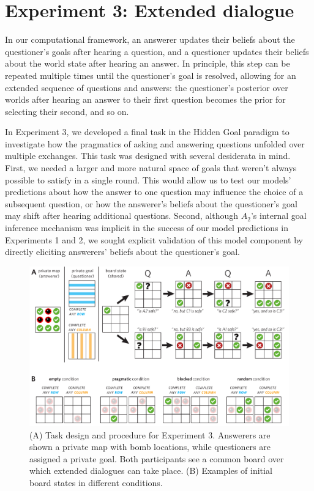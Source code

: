 \documentclass[12pt, floatsintext, jou]{apa6}
\begin{document}
\section{Experiment 3: Extended dialogue}

In our computational framework, an answerer updates their beliefs about the questioner's goals after hearing a question, and a questioner updates their beliefs about the world state after hearing an answer. 
In principle, this step can be repeated multiple times until the questioner's goal is resolved, allowing for an extended sequence of questions and answers: the questioner's posterior over worlds after hearing an answer to their first question becomes the prior for selecting their second, and so on.

In Experiment 3, we developed a final task in the Hidden Goal paradigm to investigate how the pragmatics of asking and answering questions unfolded over multiple exchanges.
This task was designed with several desiderata in mind.
First, we needed a larger and more natural space of goals that weren't always possible to satisfy in a single round.
This would allow us to test our models' predictions about how the answer to one question may influence the choice of a subsequent question, or how the answerer's beliefs about the questioner's goal may shift after hearing additional questions.
Second, although $A_2$'s internal goal inference mechanism was implicit in the success of our model predictions in Experiments 1 and 2, we sought explicit validation of this model component by directly eliciting answerers' beliefs about the questioner's goal.

\begin{figure}[tbh!]
\begin{center}
\includegraphics[scale = .7]{Exp3/spatialDemo.pdf}
\end{center}
\caption{(A) Task design and procedure for Experiment 3. Answerers are shown a private map with bomb locations, while questioners are assigned a private goal. Both participants see a common board over which extended dialogues can take place. (B) Examples of initial board states in different conditions.}
\label{fig:exp3task}
\end{figure}
\end{document}
